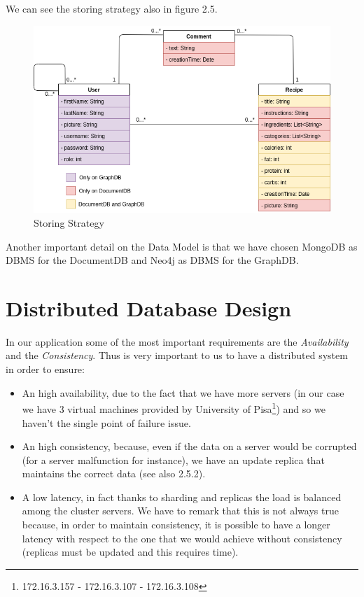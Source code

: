 \documentclass[a4paper]{report}
\begin{document}
\noindent We can see the storing strategy also in figure 2.5.

\begin{figure}[htpb]
	\centering
	\includegraphics[scale=0.5]{img/UML_colorato.png}
	\caption{Storing Strategy}
\end{figure}

\noindent Another important detail on the Data Model is that we have chosen MongoDB as DBMS for the DocumentDB and Neo4j as DBMS for the GraphDB.

\section{Distributed Database Design}
In our application some of the most important requirements are the \emph{Availability} and the \emph{Consistency}. Thus is very important to us to have a distributed system in order to ensure:
\begin{itemize}
	\item An high availability, due to the fact that we have more servers (in our case we have 3 virtual machines provided by University of Pisa\footnote{172.16.3.157 - 172.16.3.107 -  172.16.3.108}) and so we haven't the single point of failure issue.
	\item An high consistency, because, even if the data on a server would be corrupted (for a server malfunction for instance), we have an update replica that maintains the correct data (see also 2.5.2).
	\item A low latency, in fact thanks to sharding and replicas the load is balanced among the cluster servers. We have to remark that this is not always true because, in order to maintain consistency, it is possible to have a longer latency with respect to the one that we would achieve without consistency (replicas must be updated and this requires time).
\end{itemize}
\end{document}
